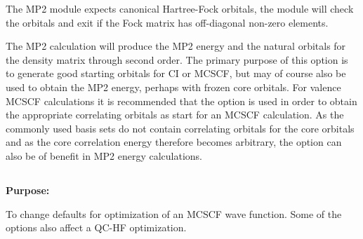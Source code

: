  
 
 
The MP2 module expects canonical Hartree-Fock orbitals, the module will
check the orbitals and exit if the Fock matrix has off-diagonal non-zero
elements.
 
The MP2 calculation will produce the MP2 energy and the natural orbitals
for the density matrix through second order.  The primary purpose of
this option is to generate good starting orbitals for CI or MCSCF, but
may of course also be used to obtain the MP2 energy, perhaps with frozen
core orbitals. For valence MCSCF calculations it is recommended that the
 option is used in order to obtain the appropriate
correlating orbitals as start
for an MCSCF calculation.  As the commonly 
used basis sets do not contain correlating orbitals for the core
orbitals and as the core correlation energy therefore becomes arbitrary,
the  option can also be of benefit in MP2 energy
calculations.
 
 
\pagebreak[3]
\subsection{\label{ref-optinp}}
 
{\bf Purpose:}
 
To change defaults for optimization of an MCSCF wave function.
Some of the options also affect a QC-HF optimization.
 
